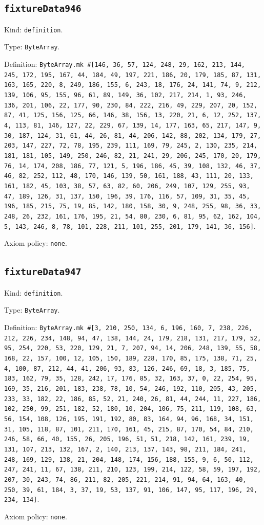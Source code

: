 \documentclass[11pt]{article}
\begin{document}
\subsection*{\texttt{fixtureData946}}
\noindent Kind: \texttt{definition}.\par
\noindent Type: \texttt{ByteArray}.\par
\noindent Definition: \texttt{ByteArray.mk \#[146, 36, 57, 124, 248, 29, 162, 213, 144, 245, 172, 195, 167, 44, 184, 49, 197, 221, 186, 20, 179, 185, 87, 131, 163, 165, 220, 8, 249, 186, 155, 6, 243, 18, 176, 24, 141, 74, 9, 212, 139, 106, 95, 155, 96, 61, 89, 149, 36, 102, 217, 214, 1, 93, 246, 136, 201, 106, 22, 177, 90, 230, 84, 222, 216, 49, 229, 207, 20, 152, 87, 41, 125, 156, 125, 66, 146, 38, 156, 13, 220, 21, 6, 12, 252, 137, 4, 113, 81, 146, 127, 22, 229, 67, 139, 14, 177, 163, 65, 217, 147, 9, 30, 187, 124, 31, 61, 44, 26, 81, 44, 206, 142, 88, 202, 134, 179, 27, 203, 147, 227, 72, 78, 195, 239, 111, 169, 79, 245, 2, 130, 235, 214, 181, 181, 105, 149, 250, 246, 82, 21, 241, 29, 206, 245, 170, 20, 179, 76, 14, 174, 208, 186, 77, 121, 5, 196, 186, 45, 39, 108, 132, 46, 37, 46, 82, 252, 112, 48, 170, 146, 139, 50, 161, 188, 43, 111, 20, 133, 161, 182, 45, 103, 38, 57, 63, 82, 60, 206, 249, 107, 129, 255, 93, 47, 189, 126, 31, 137, 150, 196, 39, 176, 116, 57, 109, 31, 35, 45, 196, 185, 215, 75, 19, 85, 142, 180, 158, 30, 9, 248, 255, 98, 36, 33, 248, 26, 232, 161, 176, 195, 21, 54, 80, 230, 6, 81, 95, 62, 162, 104, 5, 143, 246, 8, 78, 101, 228, 211, 101, 255, 201, 179, 141, 36, 156]}.\par
\noindent Axiom policy: \texttt{none}.\par
\subsection*{\texttt{fixtureData947}}
\noindent Kind: \texttt{definition}.\par
\noindent Type: \texttt{ByteArray}.\par
\noindent Definition: \texttt{ByteArray.mk \#[3, 210, 250, 134, 6, 196, 160, 7, 238, 226, 212, 226, 234, 148, 94, 47, 138, 144, 24, 179, 218, 131, 217, 179, 52, 95, 254, 220, 53, 220, 129, 21, 7, 207, 94, 14, 206, 248, 139, 55, 58, 168, 22, 157, 100, 12, 105, 150, 189, 228, 170, 85, 175, 138, 71, 25, 4, 100, 87, 212, 44, 41, 206, 93, 83, 126, 246, 69, 18, 3, 185, 75, 183, 162, 79, 35, 128, 242, 17, 176, 85, 32, 163, 37, 0, 22, 254, 95, 169, 35, 216, 201, 183, 238, 78, 10, 54, 246, 192, 110, 205, 43, 205, 233, 33, 182, 22, 186, 85, 52, 21, 240, 26, 81, 44, 244, 11, 227, 186, 102, 250, 99, 251, 182, 52, 180, 10, 204, 106, 75, 211, 119, 108, 63, 56, 154, 108, 126, 195, 191, 192, 80, 83, 164, 94, 96, 168, 34, 151, 31, 105, 118, 87, 101, 211, 170, 161, 45, 215, 87, 170, 54, 84, 210, 246, 58, 66, 40, 155, 26, 205, 196, 51, 51, 218, 142, 161, 239, 19, 131, 107, 213, 132, 167, 2, 140, 213, 137, 143, 98, 211, 184, 241, 248, 169, 129, 138, 21, 204, 148, 174, 156, 188, 155, 9, 6, 50, 112, 247, 241, 11, 67, 138, 211, 210, 123, 199, 214, 122, 58, 59, 197, 192, 207, 30, 243, 74, 86, 211, 82, 205, 221, 214, 91, 94, 64, 163, 40, 250, 39, 61, 184, 3, 37, 19, 53, 137, 91, 106, 147, 95, 117, 196, 29, 234, 134]}.\par
\noindent Axiom policy: \texttt{none}.\par
\end{document}
